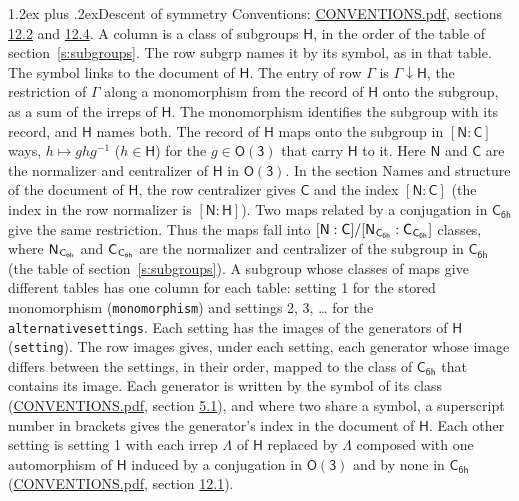 \documentclass[10pt,a4paper]{article}
\makeatletter
\renewcommand\section{\@startsection{section}{1}{\z@}{-3ex plus -1ex minus -.2ex}%
  {1.2ex plus .2ex}{\normalfont\large\sffamily\bfseries\color{parttitle}}}
\numberwithin{equation}{section}
\newcommand{\grp}[1]{\mathsf{#1}}
\newcommand{\grpindex}[2]{[#1 : #2]}
\newcommand{\restr}[2]{#1\!\downarrow#2}
\newcommand{\hairsp}{\mkern1mu}
\makeatother
\begin{document}
\section{Descent of symmetry}\label{s:subduction}
Conventions: \href{../../CONVENTIONS.pdf}{CONVENTIONS.pdf}, sections \href{../../CONVENTIONS.pdf\#conv.12.2}{12.2} and \href{../../CONVENTIONS.pdf\#conv.12.4}{12.4}.
A column is a class of subgroups $\grp{H}$, in the order of the table of section~\ref{s:subgroups}. The row subgrp names it by its symbol, as in that table. The symbol links to the document of $\grp{H}$. The entry of row $\Gamma$ is $\restr{\Gamma}{\grp{H}}$, the restriction of $\Gamma$ along a monomorphism from the record of $\grp{H}$ onto the subgroup, as a sum of the irreps of $\grp{H}$. The monomorphism identifies the subgroup with its record, and $\grp{H}$ names both. \label{n:group.normalizer.o3}\label{n:group.centralizer.o3}The record of $\grp{H}$ maps onto the subgroup in $\grpindex{\grp{N}}{\grp{C}}$ ways, $h \mapsto g h g^{-1}$ ($h \in \grp{H}$) for the $g \in \grp{O(3)}$ that carry $\grp{H}$ to it. Here $\grp{N}$ and $\grp{C}$ are the normalizer and centralizer of $\grp{H}$ in \href{O3.pdf}{$\grp{O(3)}$}. In the section Names and structure of the document of $\grp{H}$, the row centralizer gives $\grp{C}$ and the index $\grpindex{\grp{N}}{\grp{C}}$ (the index in the row normalizer is $\grpindex{\grp{N}}{\grp{H}}$). Two maps related by a conjugation in $\grp{C_{6h}}$ give the same restriction. Thus the maps fall into $\grpindex{\grp{N}}{\grp{C}}/\grpindex{\grp{N}_{\hairsp \grp{C_{6h}}}}{\grp{C}_{\hairsp \grp{C_{6h}}}}$ classes, where $\grp{N}_{\hairsp \grp{C_{6h}}}$ and $\grp{C}_{\hairsp \grp{C_{6h}}}$ are the normalizer and centralizer of the subgroup in $\grp{C_{6h}}$ (the table of section~\ref{s:subgroups}). \label{n:head.setting}A subgroup whose classes of maps give different tables has one column for each table: setting 1 for the stored monomorphism (\texttt{monomorphism}) and settings 2, 3, \dots{} for the \texttt{alternativesettings}. Each setting has the images of the generators of $\grp{H}$ (\texttt{setting}). \label{n:head.images}The row images gives, under each setting, each generator whose image differs between the settings, in their order, mapped to the class of $\grp{C_{6h}}$ that contains its image. Each generator is written by the symbol of its class (\href{../../CONVENTIONS.pdf}{CONVENTIONS.pdf}, section \href{../../CONVENTIONS.pdf\#conv.5.1}{5.1}), and where two share a symbol, a superscript number in brackets gives the generator's index in the document of $\grp{H}$. \label{n:irrep.Delta}Each other setting is setting 1 with each irrep $\Lambda$ of $\grp{H}$ replaced by $\Lambda$ composed with one automorphism of $\grp{H}$ induced by a conjugation in \href{O3.pdf}{$\grp{O(3)}$} and by none in $\grp{C_{6h}}$ (\href{../../CONVENTIONS.pdf}{CONVENTIONS.pdf}, section \href{../../CONVENTIONS.pdf\#conv.12.1}{12.1}).
\end{document}

